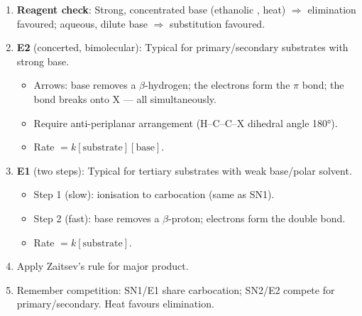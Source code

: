 \documentclass[11pt]{article}
\begin{document}
\begin{methode}
\begin{enumerate}
\item \textbf{Reagent check}: Strong, concentrated base (ethanolic , heat) $\Rightarrow$ elimination favoured; aqueous, dilute base $\Rightarrow$ substitution favoured.
\item \textbf{E2} (concerted, bimolecular): Typical for primary/secondary substrates with strong base.
\begin{itemize}
\item Arrows: base removes a $\beta$-hydrogen; the  electrons form the  $\pi$ bond; the  bond breaks onto X — all simultaneously.
\item Require anti-periplanar arrangement (H–C–C–X dihedral angle 180°).
\item Rate $= k[\text{substrate}][\text{base}]$.
\end{itemize}
\item \textbf{E1} (two steps): Typical for tertiary substrates with weak base/polar solvent.
\begin{itemize}
\item Step 1 (slow): ionisation to carbocation (same as SN1).
\item Step 2 (fast): base removes a $\beta$-proton;  electrons form the double bond.
\item Rate $= k[\text{substrate}]$.
\end{itemize}
\item Apply Zaitsev's rule for major product.
\item Remember competition: SN1/E1 share carbocation; SN2/E2 compete for primary/secondary. Heat favours elimination.
\end{enumerate}
\end{methode}
\end{document}

